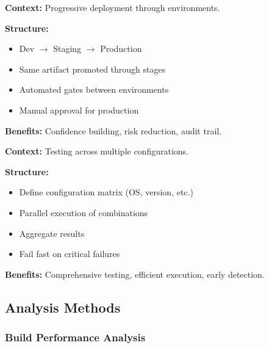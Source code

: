\documentclass[11pt,letterpaper]{article}
\begin{document}
\begin{patternbox}
\textbf{Context:} Progressive deployment through environments.

\textbf{Structure:}
\begin{itemize}[nosep]
    \item Dev $\rightarrow$ Staging $\rightarrow$ Production
    \item Same artifact promoted through stages
    \item Automated gates between environments
    \item Manual approval for production
\end{itemize}

\textbf{Benefits:} Confidence building, risk reduction, audit trail.
\end{patternbox}

\begin{patternbox}
\textbf{Context:} Testing across multiple configurations.

\textbf{Structure:}
\begin{itemize}[nosep]
    \item Define configuration matrix (OS, version, etc.)
    \item Parallel execution of combinations
    \item Aggregate results
    \item Fail fast on critical failures
\end{itemize}

\textbf{Benefits:} Comprehensive testing, efficient execution, early detection.
\end{patternbox}

\subsection{Analysis Methods}

\subsubsection{Build Performance Analysis}
\end{document}
